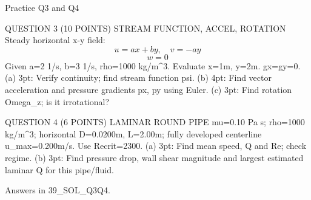 Practice Q3 and Q4

QUESTION 3 (10 POINTS)
STREAM FUNCTION, ACCEL, ROTATION
Steady horizontal x-y field:
$$u=ax+by,\quad v=-ay$$
$$w=0$$
Given a=2 1/s, b=3 1/s, rho=1000 kg/m^3. Evaluate x=1m, y=2m. gx=gy=0.
(a) 3pt: Verify continuity; find stream function psi.
(b) 4pt: Find vector acceleration and pressure gradients px, py using Euler.
(c) 3pt: Find rotation Omega_z; is it irrotational?

QUESTION 4 (6 POINTS)
LAMINAR ROUND PIPE
mu=0.10 Pa s; rho=1000 kg/m^3; horizontal D=0.0200m, L=2.00m; fully developed centerline u_max=0.200m/s. Use Recrit=2300.
(a) 3pt: Find mean speed, Q and Re; check regime.
(b) 3pt: Find pressure drop, wall shear magnitude and largest estimated laminar Q for this pipe/fluid.

Answers in 39_SOL_Q3Q4.

